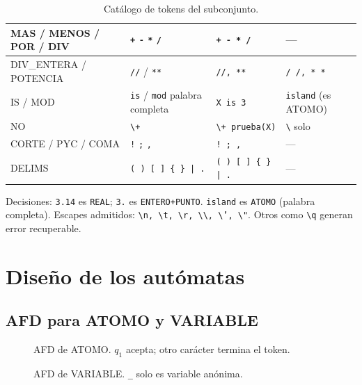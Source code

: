 \documentclass[12pt,a4paper]{article}
\begin{document}
\begin{table}[H]
{\begin{tabular}{|l|l|l|l|}
MAS / MENOS / POR / DIV & \texttt{+} \texttt{-} \texttt{*} \texttt{/} & \texttt{+ - * /} & --- \\ \hline
DIV\_ENTERA / POTENCIA & \texttt{//} / \texttt{**} & \texttt{//, **} & \texttt{/ /, * *} \\ \hline
IS / MOD & \texttt{is} / \texttt{mod} palabra completa & \texttt{X is 3} & \texttt{island} (es ATOMO) \\ \hline
NO & \texttt{\textbackslash+} & \texttt{\textbackslash+ prueba(X)} & \texttt{\textbackslash} solo \\ \hline
CORTE / PYC / COMA & \texttt{!} \texttt{;} \texttt{,} & \texttt{! ; ,} & --- \\ \hline
DELIMS & \texttt{( ) [ ] \{ \} | .} & \texttt{( ) [ ] \{ \} | .} & --- \\ \hline
\end{tabular}%
}
\caption{Catálogo de tokens del subconjunto.}
\label{tab:tokens}
\end{table}

Decisiones: \texttt{3.14} es \texttt{REAL}; \texttt{3.} es \texttt{ENTERO+PUNTO}. \texttt{island} es \texttt{ATOMO} (palabra completa). Escapes admitidos: \texttt{\textbackslash n, \textbackslash t, \textbackslash r, \textbackslash\textbackslash, \textbackslash', \textbackslash"}. Otros como \texttt{\textbackslash q} generan error recuperable.

\section{Diseño de los autómatas}
\subsection{AFD para ATOMO y VARIABLE}
\begin{figure}[H]
\centering
{}
\caption{AFD de ATOMO. $q_1$ acepta; otro carácter termina el token.}
\end{figure}
\begin{figure}[H]
\centering
{}
\caption{AFD de VARIABLE. \texttt{\_} solo es variable anónima.}
\end{figure}
\end{document}
